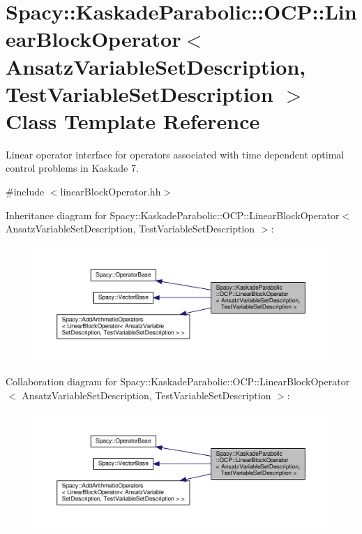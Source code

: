 \hypertarget{classSpacy_1_1KaskadeParabolic_1_1OCP_1_1LinearBlockOperator}{\section{Spacy\-:\-:Kaskade\-Parabolic\-:\-:O\-C\-P\-:\-:Linear\-Block\-Operator$<$ Ansatz\-Variable\-Set\-Description, Test\-Variable\-Set\-Description $>$ Class Template Reference}
\label{classSpacy_1_1KaskadeParabolic_1_1OCP_1_1LinearBlockOperator}
}


Linear operator interface for operators associated with time dependent optimal control problems in Kaskade 7.  




{\ttfamily \#include $<$linear\-Block\-Operator.\-hh$>$}



Inheritance diagram for Spacy\-:\-:Kaskade\-Parabolic\-:\-:O\-C\-P\-:\-:Linear\-Block\-Operator$<$ Ansatz\-Variable\-Set\-Description, Test\-Variable\-Set\-Description $>$\-:
\nopagebreak
\begin{figure}[H]
\begin{center}
\leavevmode
\includegraphics[width=350pt]{classSpacy_1_1KaskadeParabolic_1_1OCP_1_1LinearBlockOperator__inherit__graph}
\end{center}
\end{figure}


Collaboration diagram for Spacy\-:\-:Kaskade\-Parabolic\-:\-:O\-C\-P\-:\-:Linear\-Block\-Operator$<$ Ansatz\-Variable\-Set\-Description, Test\-Variable\-Set\-Description $>$\-:
\nopagebreak
\begin{figure}[H]
\begin{center}
\leavevmode
\includegraphics[width=350pt]{classSpacy_1_1KaskadeParabolic_1_1OCP_1_1LinearBlockOperator__coll__graph}
\end{center}
\end{figure}
